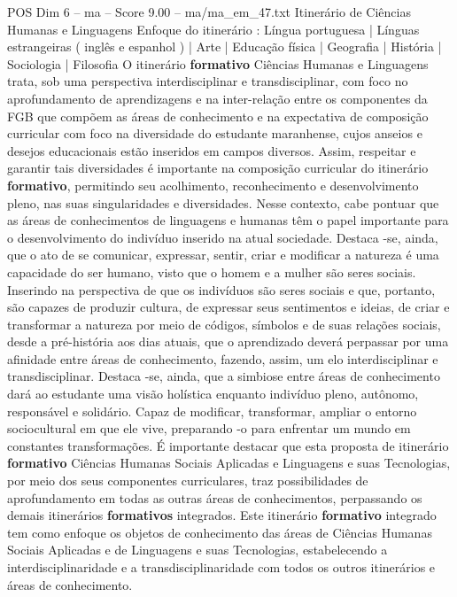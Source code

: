 \begin{textsample}{POS Dim 6 – ma – Score 9.00 – ma/ma\_em\_47.txt}  \label{ex:f6_pos_095}
Itinerário de Ciências Humanas e Linguagens Enfoque do itinerário : Língua portuguesa | Línguas estrangeiras ( inglês e espanhol ) | Arte | Educação física | Geografia | História | Sociologia | Filosofia O itinerário \textbf{formativo} Ciências Humanas e Linguagens trata, sob uma perspectiva interdisciplinar e transdisciplinar, com foco no aprofundamento de aprendizagens e na inter-relação entre os componentes da FGB que compõem as áreas de conhecimento e na expectativa de composição curricular com foco na diversidade do estudante maranhense, cujos anseios e desejos educacionais estão inseridos em campos diversos.
Assim, respeitar e garantir tais diversidades é importante na composição curricular do itinerário \textbf{formativo}, permitindo seu acolhimento, reconhecimento e desenvolvimento pleno, nas suas singularidades e diversidades.
Nesse contexto, cabe pontuar que as áreas de conhecimentos de linguagens e humanas têm o papel importante para o desenvolvimento do indivíduo inserido na atual sociedade.
Destaca -se, ainda, que o ato de se comunicar, expressar, sentir, criar e modificar a natureza é uma capacidade do ser humano, visto que o homem e a mulher são seres sociais.
Inserindo na perspectiva de que os indivíduos são seres sociais e que, portanto, são capazes de produzir cultura, de expressar seus sentimentos e ideias, de criar e transformar a natureza por meio de códigos, símbolos e de suas relações sociais, desde a pré-história aos dias atuais, que o aprendizado deverá perpassar por uma afinidade entre áreas de conhecimento, fazendo, assim, um elo interdisciplinar e transdisciplinar.
Destaca -se, ainda, que a simbiose entre áreas de conhecimento dará ao estudante uma visão holística enquanto indivíduo pleno, autônomo, responsável e solidário.
Capaz de modificar, transformar, ampliar o entorno sociocultural em que ele vive, preparando -o para enfrentar um mundo em constantes transformações.
É importante destacar que esta proposta de itinerário \textbf{formativo} Ciências Humanas Sociais Aplicadas e Linguagens e suas Tecnologias, por meio dos seus componentes curriculares, traz possibilidades de aprofundamento em todas as outras áreas de conhecimentos, perpassando os demais itinerários \textbf{formativos} integrados.
Este itinerário \textbf{formativo} integrado tem como enfoque os objetos de conhecimento das áreas de Ciências Humanas Sociais Aplicadas e de Linguagens e suas Tecnologias, estabelecendo a interdisciplinaridade e a transdisciplinaridade com todos os outros itinerários e áreas de conhecimento.

\end{textsample}
